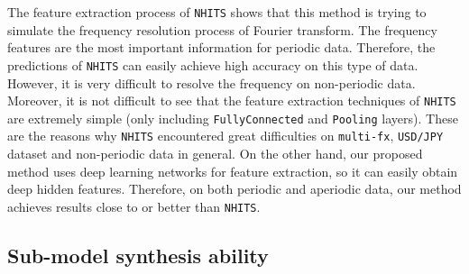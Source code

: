 \documentclass[aps,prb,groupedaddress,twocolumn,showpacs,dvipdfmx,superscriptaddress,pdftex]{revtex4-2}
\begin{document}
The feature extraction process of \verb|NHITS| shows that this method is trying to simulate the frequency resolution process of Fourier transform. The frequency features are the most important information for periodic data. Therefore, the predictions of \verb|NHITS| can easily achieve high accuracy on this type of data. However, it is very difficult to resolve the frequency on non-periodic data. Moreover, it is not difficult to see that the feature extraction techniques of \verb|NHITS| are extremely simple (only including \verb|FullyConnected| and \verb|Pooling| layers). These are the reasons why \verb|NHITS| encountered great difficulties on \verb|multi-fx|, \verb|USD/JPY| dataset and non-periodic data in general. On the other hand, our proposed method uses deep learning networks for feature extraction, so it can easily obtain deep hidden features. Therefore, on both periodic and aperiodic data, our method achieves results close to or better than \verb|NHITS|.



\subsection{Sub-model synthesis ability}

\end{document}
